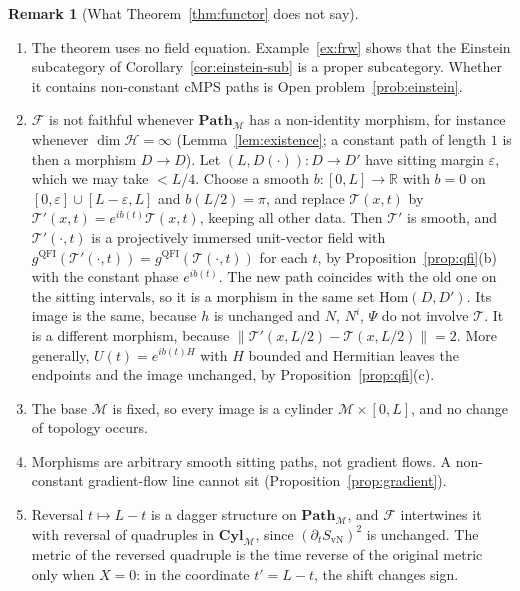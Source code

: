 \documentclass[11pt,a4paper,reqno]{amsart}
\theoremstyle{definition}
\newtheorem{remark}[theorem]{Remark}
\numberwithin{equation}{section}
\newcommand{\R}{\mathbb{R}}
\newcommand{\QFI}{\mathrm{QFI}}
\newcommand{\Path}{\mathbf{Path}_{\mathcal{M}}}
\newcommand{\Cyl}{\mathbf{Cyl}_{\mathcal{M}}}
\begin{document}
\begin{remark}[What Theorem~\ref{thm:functor} does not say]\label{rem:limits}
\begin{enumerate}[label=(\alph*)]
    \item The theorem uses no field equation. Example~\ref{ex:frw} shows that the Einstein subcategory of Corollary~\ref{cor:einstein-sub} is a proper subcategory. Whether it contains non-constant cMPS paths is Open problem~\ref{prob:einstein}.
    \item $\mathcal{F}$ is not faithful whenever $\Path$ has a non-identity morphism, for instance whenever $\dim\mathcal{H}=\infty$ (Lemma~\ref{lem:existence}; a constant path of length $1$ is then a morphism $D\to D$). Let $(L,D(\cdot)):D\to D'$ have sitting margin $\varepsilon$, which we may take $<L/4$. Choose a smooth $b:[0,L]\to\R$ with $b=0$ on $[0,\varepsilon]\cup[L-\varepsilon,L]$ and $b(L/2)=\pi$, and replace $\mathcal{T}(x,t)$ by $\mathcal{T}'(x,t)=e^{ib(t)}\mathcal{T}(x,t)$, keeping all other data. Then $\mathcal{T}'$ is smooth, and $\mathcal{T}'(\cdot,t)$ is a projectively immersed unit-vector field with $g^{\QFI}(\mathcal{T}'(\cdot,t))=g^{\QFI}(\mathcal{T}(\cdot,t))$ for each $t$, by Proposition~\ref{prop:qfi}(b) with the constant phase $e^{ib(t)}$. The new path coincides with the old one on the sitting intervals, so it is a morphism in the same set $\mathrm{Hom}(D,D')$. Its image is the same, because $h$ is unchanged and $N$, $N^i$, $\Psi$ do not involve $\mathcal{T}$. It is a different morphism, because $\|\mathcal{T}'(x,L/2)-\mathcal{T}(x,L/2)\|=2$. More generally, $U(t)=e^{ib(t)H}$ with $H$ bounded and Hermitian leaves the endpoints and the image unchanged, by Proposition~\ref{prop:qfi}(c).
    \item The base $\mathcal{M}$ is fixed, so every image is a cylinder $\mathcal{M}\times[0,L]$, and no change of topology occurs.
    \item Morphisms are arbitrary smooth sitting paths, not gradient flows. A non-constant gradient-flow line cannot sit (Proposition~\ref{prop:gradient}).
    \item Reversal $t\mapsto L-t$ is a dagger structure on $\Path$, and $\mathcal{F}$ intertwines it with reversal of quadruples in $\Cyl$, since $(\partial_tS_{\mathrm{vN}})^2$ is unchanged. The metric of the reversed quadruple is the time reverse of the original metric only when $X=0$: in the coordinate $t'=L-t$, the shift changes sign.
\end{enumerate}
\end{remark}
\end{document}
